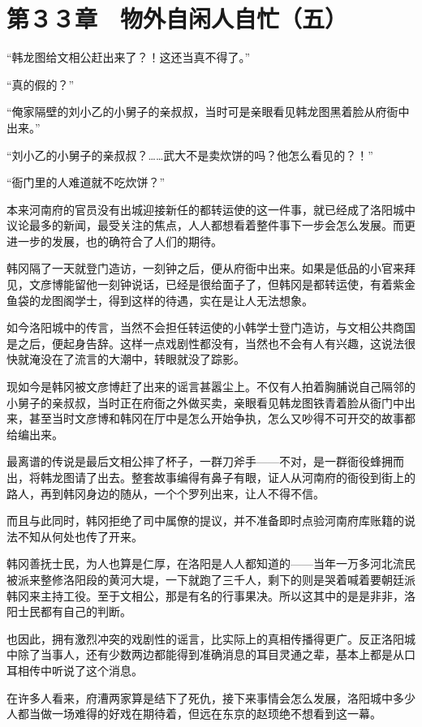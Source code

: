 \section{第３３章　物外自闲人自忙（五）}

“韩龙图给文相公赶出来了？！这还当真不得了。”

“真的假的？”

“俺家隔壁的刘小乙的小舅子的亲叔叔，当时可是亲眼看见韩龙图黑着脸从府衙中出来。”

“刘小乙的小舅子的亲叔叔？……武大不是卖炊饼的吗？他怎么看见的？！”

“衙门里的人难道就不吃炊饼？”

本来河南府的官员没有出城迎接新任的都转运使的这一件事，就已经成了洛阳城中议论最多的新闻，最受关注的焦点，人人都想看着整件事下一步会怎么发展。而更进一步的发展，也的确符合了人们的期待。

韩冈隔了一天就登门造访，一刻钟之后，便从府衙中出来。如果是低品的小官来拜见，文彦博能留他一刻钟说话，已经是很给面子了，但韩冈是都转运使，有着紫金鱼袋的龙图阁学士，得到这样的待遇，实在是让人无法想象。

如今洛阳城中的传言，当然不会担任转运使的小韩学士登门造访，与文相公共商国是之后，便起身告辞。这样一点戏剧性都没有，当然也不会有人有兴趣，这说法很快就淹没在了流言的大潮中，转眼就没了踪影。

现如今是韩冈被文彦博赶了出来的谣言甚嚣尘上。不仅有人拍着胸脯说自己隔邻的小舅子的亲叔叔，当时正在府衙之外做买卖，亲眼看见韩龙图铁青着脸从衙门中出来，甚至当时文彦博和韩冈在厅中是怎么开始争执，怎么又吵得不可开交的故事都给编出来。

最离谱的传说是最后文相公摔了杯子，一群刀斧手——不对，是一群衙役蜂拥而出，将韩龙图请了出去。整套故事编得有鼻子有眼，证人从河南府的衙役到街上的路人，再到韩冈身边的随从，一个个罗列出来，让人不得不信。

而且与此同时，韩冈拒绝了司中属僚的提议，并不准备即时点验河南府库账籍的说法不知从何处也传了开来。

韩冈善抚士民，为人也算是仁厚，在洛阳是人人都知道的——当年一万多河北流民被派来整修洛阳段的黄河大堤，一下就跑了三千人，剩下的则是哭着喊着要朝廷派韩冈来主持工役。至于文相公，那是有名的行事果决。所以这其中的是是非非，洛阳士民都有自己的判断。

也因此，拥有激烈冲突的戏剧性的谣言，比实际上的真相传播得更广。反正洛阳城中除了当事人，还有少数两边都能得到准确消息的耳目灵通之辈，基本上都是从口耳相传中听说了这个消息。

在许多人看来，府漕两家算是结下了死仇，接下来事情会怎么发展，洛阳城中多少人都当做一场难得的好戏在期待着，但远在东京的赵顼绝不想看到这一幕。


